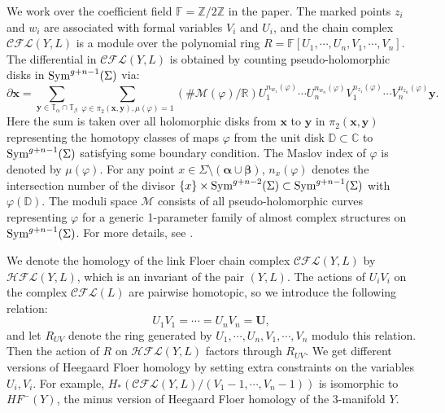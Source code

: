 \documentclass[10pt,a4paper]{amsart}
\newcommand{\F}{\mathbb{F}}
\newcommand{\cCFL}{\mathcal{C\!F\!L}}
\newcommand{\cHFL}{\mathcal{H\!F\! L}}
\newcommand{\alphas}{\boldsymbol{\alpha}}
\newcommand{\betas}{\boldsymbol{\beta}}
\newcommand{\x}{\mathbf{x}}
\newcommand{\y}{\mathbf{y}}
\def\x{\mathbf{x}}
\def\y{\mathbf{y}}
\newcommand{\Z}{\mathbb{Z}}
\newcommand{\R}{\mathbb{R}}
\newcommand{\UU}{\mathbf{U}}
\begin{document}
We work over the coefficient field $\F=\Z/ 2\Z$ in the paper. The marked points $z_i$ and $w_i$ are associated with formal variables $V_i$ and $U_i$, and the chain complex $\cCFL(Y,L)$ is a module over  the polynomial ring $R=\F[U_1, \cdots, U_n, V_1, \cdots, V_n]$. The differential in $\cCFL(Y, L)$ is obtained by counting pseudo-holomorphic disks in $\textup{Sym}^{g+n-1}(\Sigma)$ via:
\begin{equation}
\label{eq: HF differential}
\partial \x=\sum_{\y\in \mathbb{T}_\alpha\cap \mathbb{T}_\beta}\sum_{\varphi\in \pi_2(\x, \y),\mu(\varphi)=1}(\# \mathcal{M}(\varphi)/\R) U_1^{n_{w_1}(\varphi)}\cdots U_n^{n_{w_{n}}(\varphi)}V_1^{n_{z_{1}}(\varphi)}\cdots V_n^{n_{z_n}(\varphi)} \y. 
\end{equation}
Here the sum is taken over all holomorphic disks from $\x$ to $\y$ in $\pi_2(\x, \y)$ representing the homotopy classes of maps $\varphi$ from the unit disk $\mathbb{D}\subset \mathbb{C} $ to $\textup{Sym}^{g+n-1}(\Sigma)$ satisfying some boundary condition.  The Maslov index of $\varphi$ is denoted by $\mu(\varphi)$. For any point $x\in \Sigma\setminus (\alphas\cup \betas)$, $n_x(\varphi)$ denotes the intersection number of the divisor $\{x\} \times \textup{Sym}^{g+n-2}(\Sigma)\subset \textup{Sym}^{g+n-1}(\Sigma)$ with $\varphi(\mathbb{D})$.  The moduli space $\mathcal{M}$ consists of all pseudo-holomorphic curves representing $\varphi$ for a generic 1-parameter family of almost complex structures on $\textup{Sym}^{g+n-1}(\Sigma)$. For more details, see \cite{OSProperties}. 

We denote the homology of the link Floer chain complex $\cCFL(Y, L)$ by $\cHFL(Y, L)$, which is an invariant of the pair $(Y, L)$.  The actions of $U_iV_i$ on the complex $\cCFL(L)$ are pairwise homotopic, so we introduce the following relation:
$$U_1V_1=\cdots =U_nV_n=\UU,$$
and let $R_{UV}$ denote the ring generated by $U_1, \cdots, U_n, V_1, \cdots, V_n$ modulo this relation.  Then the action of $R$ on $\cHFL(Y, L)$ factors through $R_{UV}$. We get different versions of Heegaard Floer homology by setting extra constraints on the  variables $U_i, V_i$. For example, $H_\ast(\cCFL(Y, L)/(V_1-1, \cdots, V_n-1))$ is isomorphic to $\mathit{HF}^-(Y)$, the minus version of Heegaard Floer homology of the 3-manifold $Y$. 
\end{document}
